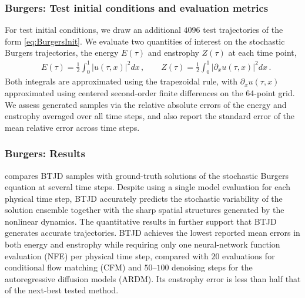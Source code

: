 \documentclass[oneside,11pt]{article}
\theoremstyle{remark}
\begin{document}
\subsubsection{Burgers: Test initial conditions and evaluation metrics}\label{sec:BurgersMetrics}
For test initial conditions, we draw an additional $4096$ test trajectories of the form \eqref{eq:BurgersInit}. We evaluate two quantities of interest on the stochastic Burgers trajectories, the energy $E(\tau)$ and enstrophy $Z(\tau)$ at each time point,
\begin{align}\label{eq:BurgEnergyEnstrophy}
        &E(\tau) = \frac{1}{2} \int_0^1 |u(\tau,x)|^2 dx\,,\qquad Z(\tau) = \frac{1}{2} \int_0^1 |\partial_xu(\tau,x)|^2 dx\,.
    \end{align}
    Both integrals are approximated using the trapezoidal rule, with $\partial_xu(\tau,x)$ approximated using centered second-order finite differences on the 64-point grid.
    We assess generated samples via the relative absolute errors of the energy and enstrophy averaged over all time steps, and also report the standard error of the mean relative error across time steps.  
    


\subsubsection{Burgers: Results}
 compares BTJD samples with ground-truth solutions of the stochastic Burgers equation at several time steps. Despite using a single model evaluation for each physical time step, BTJD accurately predicts the stochastic variability of the solution ensemble together with the sharp spatial structures generated by the nonlinear dynamics.
The quantitative results in  further support that BTJD generates accurate trajectories. BTJD achieves the lowest reported mean errors in both energy and enstrophy while requiring only one neural-network function evaluation (NFE) per physical time step, compared with $20$ evaluations for conditional flow matching (CFM) and $50$--$100$ denoising steps for the autoregressive diffusion models (ARDM). Its enstrophy error is less than half that of the next-best tested method. 
\end{document}
